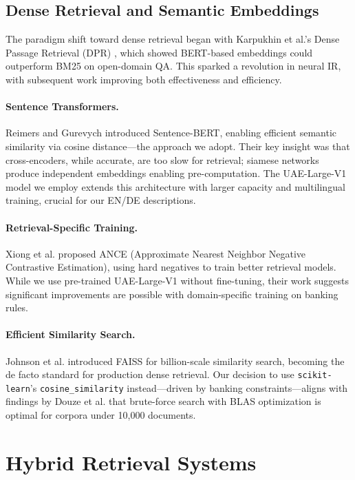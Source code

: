 \subsection{Dense Retrieval and Semantic Embeddings}

The paradigm shift toward dense retrieval began with Karpukhin et al.'s Dense Passage Retrieval (DPR) \cite{karpukhin2020dense}, which showed BERT-based embeddings could outperform BM25 on open-domain QA. This sparked a revolution in neural IR, with subsequent work improving both effectiveness and efficiency.

\paragraph{Sentence Transformers.} Reimers and Gurevych \cite{reimers2019sentence} introduced Sentence-BERT, enabling efficient semantic similarity via cosine distance—the approach we adopt. Their key insight was that cross-encoders, while accurate, are too slow for retrieval; siamese networks produce independent embeddings enabling pre-computation. The UAE-Large-V1 model we employ \cite{uae2023large} extends this architecture with larger capacity and multilingual training, crucial for our EN/DE descriptions.

\paragraph{Retrieval-Specific Training.} Xiong et al. \cite{xiong2021approximate} proposed ANCE (Approximate Nearest Neighbor Negative Contrastive Estimation), using hard negatives to train better retrieval models. While we use pre-trained UAE-Large-V1 without fine-tuning, their work suggests significant improvements are possible with domain-specific training on banking rules.

\paragraph{Efficient Similarity Search.} Johnson et al. \cite{johnson2019billion} introduced FAISS for billion-scale similarity search, becoming the de facto standard for production dense retrieval. Our decision to use \texttt{scikit-learn}'s \texttt{cosine\_similarity} instead—driven by banking constraints—aligns with findings by Douze et al. \cite{douze2024faiss} that brute-force search with BLAS optimization is optimal for corpora under 10,000 documents.

\section{Hybrid Retrieval Systems}

